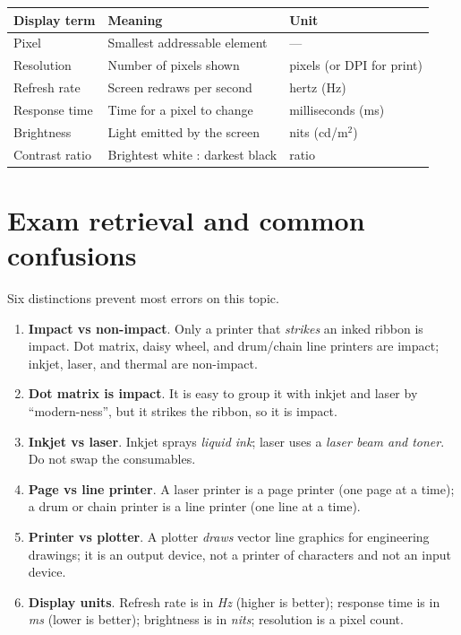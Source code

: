 \begin{center}
\begin{tabular}{lll}
\toprule
\textbf{Display term} & \textbf{Meaning} & \textbf{Unit} \\
\midrule
Pixel & Smallest addressable element & --- \\
Resolution & Number of pixels shown & pixels (or DPI for print) \\
Refresh rate & Screen redraws per second & hertz (Hz) \\
Response time & Time for a pixel to change & milliseconds (ms) \\
Brightness & Light emitted by the screen & nits (cd/m$^2$) \\
Contrast ratio & Brightest white : darkest black & ratio \\
\bottomrule
\end{tabular}
\end{center}

\section{Exam retrieval and common confusions}
Six distinctions prevent most errors on this topic.
\begin{enumerate}
  \item \textbf{Impact vs non-impact}. Only a printer that \emph{strikes} an
    inked ribbon is impact. Dot matrix, daisy wheel, and drum/chain line
    printers are impact; inkjet, laser, and thermal are non-impact.
  \item \textbf{Dot matrix is impact}. It is easy to group it with inkjet and
    laser by ``modern-ness'', but it strikes the ribbon, so it is impact.
  \item \textbf{Inkjet vs laser}. Inkjet sprays \emph{liquid ink}; laser uses
    a \emph{laser beam and toner}. Do not swap the consumables.
  \item \textbf{Page vs line printer}. A laser printer is a page printer
    (one page at a time); a drum or chain printer is a line printer (one line
    at a time).
  \item \textbf{Printer vs plotter}. A plotter \emph{draws} vector line
    graphics for engineering drawings; it is an output device, not a printer
    of characters and not an input device.
  \item \textbf{Display units}. Refresh rate is in \emph{Hz} (higher is
    better); response time is in \emph{ms} (lower is better); brightness is
    in \emph{nits}; resolution is a pixel count.
\end{enumerate}

